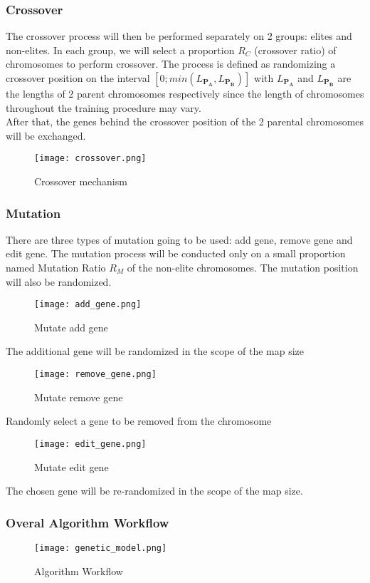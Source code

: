   \subsubsection*{Crossover}
  The crossover process will then be performed separately on 2 groups: elites and non-elites.
  In each group, we will select a proportion $R_C$ (crossover ratio) of chromosomes to perform crossover. The process is defined as randomizing a crossover position on the interval $\left[0; min(L_{\mathbf{P_A}}, L_{\mathbf{P_B}})\right]$ with $L_\mathbf{P_A}$ and $L_\mathbf{P_B}$ are the lengths of 2 parent chromosomes respectively since the length of chromosomes throughout the training procedure may vary.\\
After that, the genes behind the crossover position of the 2 parental chromosomes will be exchanged.
  \begin{figure}[H]
    \centering
    \texttt{[image: crossover.png]}
    \caption{Crossover mechanism}
  \end{figure}

  \subsubsection*{Mutation}
  There are three types of mutation going to be used: add gene, remove gene and edit gene. The mutation process will be conducted only on a small proportion named Mutation Ratio $R_M$ of the non-elite chromosomes. The mutation position will also be randomized.
  \begin{figure}[H]
    \centering
    \texttt{[image: add\_gene.png]}
    \caption{Mutate add gene}
  \end{figure}
  The additional gene will be randomized in the scope of the map size
  \begin{figure}[H]
    \centering
    \texttt{[image: remove\_gene.png]}
    \caption{Mutate remove gene}
  \end{figure}
  Randomly select a gene to be removed from the chromosome
  \begin{figure}[H]
    \centering
    \texttt{[image: edit\_gene.png]}
    \caption{Mutate edit gene}
  \end{figure}
  The chosen gene will be re-randomized in the scope of the map size.

  \subsubsection{Overal Algorithm Workflow}
  \begin{figure}[H]
    \centering
    \texttt{[image: genetic\_model.png]}
    \caption{Algorithm Workflow}
  \end{figure}

